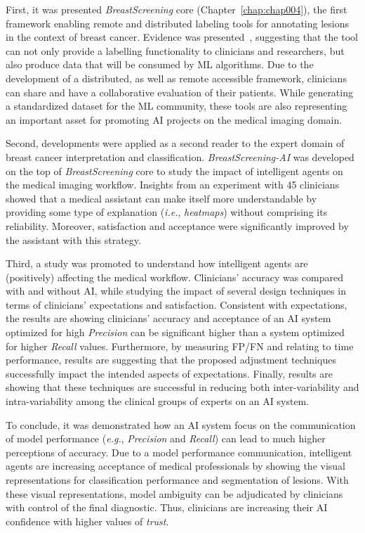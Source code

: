 First, it was presented {\it BreastScreening} core (Chapter~\ref{chap:chap004}), the first framework enabling remote and distributed labeling tools for annotating lesions in the context of breast cancer.
Evidence was presented~\cite{10.1145/3399715.3399744}, suggesting that the tool can not only provide a labelling functionality to clinicians and researchers, but also produce data that will be consumed by \ac{ML} algorithms.
Due to the development of a distributed, as well as remote accessible framework, clinicians can share and have a collaborative evaluation of their patients.
While generating a standardized dataset for the \ac{ML} community, these tools are also representing an important asset for promoting \ac{AI} projects on the medical imaging domain.

Second, developments were applied as a second reader to the expert domain of breast cancer interpretation and classification.
{\it BreastScreening-AI} was developed on the top of {\it BreastScreening} core to study the impact of intelligent agents on the medical imaging workflow.
Insights from an experiment with 45 clinicians showed that a medical assistant can make itself more understandable by providing some type of explanation ({\it i.e.}, {\it heatmaps}) without comprising its reliability.
Moreover, satisfaction and acceptance were significantly improved by the assistant with this strategy.

Third, a study was promoted to understand how intelligent agents are (positively) affecting the medical workflow.
Clinicians' accuracy was compared with and without \ac{AI}, while studying the impact of several design techniques in terms of clinicians' expectations and satisfaction.
Consistent with expectations, the results are showing clinicians' accuracy and acceptance of an \ac{AI} system optimized for high {\it Precision} can be significant higher than a system optimized for higher {\it Recall} values.
Furthermore, by measuring \ac{FP}/\ac{FN} and relating to time performance, results are suggesting that the proposed adjustment techniques successfully impact the intended aspects of expectations.
Finally, results are showing that these techniques are successful in reducing both inter-variability and intra-variability among the clinical groups of experts on an \ac{AI} system.

To conclude, it was demonstrated how an \ac{AI} system focus on the communication of model performance ({\it e.g.}, {\it Precision} and {\it Recall}) can lead to much higher perceptions of accuracy.
Due to a model performance communication, intelligent agents are increasing acceptance of medical professionals by showing the visual representations for classification performance and segmentation of lesions.
With these visual representations, model ambiguity can be adjudicated by clinicians with control of the final diagnostic.
Thus, clinicians are increasing their \ac{AI} confidence with higher values of {\it trust}.

